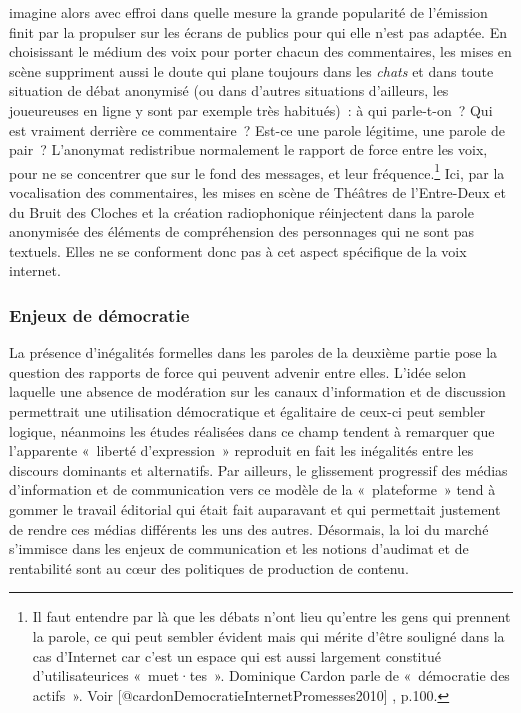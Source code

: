 \documentclass[
]{article}
\begin{document}
imagine alors avec effroi dans quelle mesure la grande popularité de l'émission finit par la propulser sur les écrans de publics pour qui elle n'est pas adaptée. En choisissant le médium des voix pour porter chacun des commentaires, les mises en scène suppriment aussi le doute qui plane toujours dans les \emph{chats} et dans toute situation de débat anonymisé (ou dans d'autres situations d'ailleurs, les joueureuses en ligne y sont par exemple très habitués)~: à qui parle-t-on~? Qui est vraiment derrière ce commentaire~? Est-ce une parole légitime, une parole de pair~? L'anonymat redistribue normalement le rapport de force entre les voix, pour ne se concentrer que sur le fond des messages, et leur fréquence.\footnote{Il faut entendre par là que les débats n'ont lieu qu'entre les gens qui prennent la parole, ce qui peut sembler évident mais qui mérite d'être souligné dans la cas d'Internet car c'est un espace qui est aussi largement constitué d'utilisateurices «~muet·tes~». Dominique Cardon parle de «~démocratie des actifs~». Voir {[}@cardonDemocratieInternetPromesses2010{]} , p.100.} Ici, par la vocalisation des commentaires, les mises en scène de Théâtres de l'Entre-Deux et du Bruit des Cloches et la création radiophonique réinjectent dans la parole anonymisée des éléments de compréhension des personnages qui ne sont pas textuels. Elles ne se conforment donc pas à cet aspect spécifique de la voix internet.

\subsubsection{Enjeux de démocratie}\label{enjeux-de-duxe9mocratie}

La présence d'inégalités formelles dans les paroles de la deuxième partie pose la question des rapports de force qui peuvent advenir entre elles. L'idée selon laquelle une absence de modération sur les canaux d'information et de discussion permettrait une utilisation démocratique et égalitaire de ceux-ci peut sembler logique, néanmoins les études réalisées dans ce champ tendent à remarquer que l'apparente «~liberté d'expression~» reproduit en fait les inégalités entre les discours dominants et alternatifs. Par ailleurs, le glissement progressif des médias d'information et de communication vers ce modèle de la «~plateforme~» tend à gommer le travail éditorial qui était fait auparavant et qui permettait justement de rendre ces médias différents les uns des autres. Désormais, la loi du marché s'immisce dans les enjeux de communication et les notions d'audimat et de rentabilité sont au cœur des politiques de production de contenu.
\end{document}

